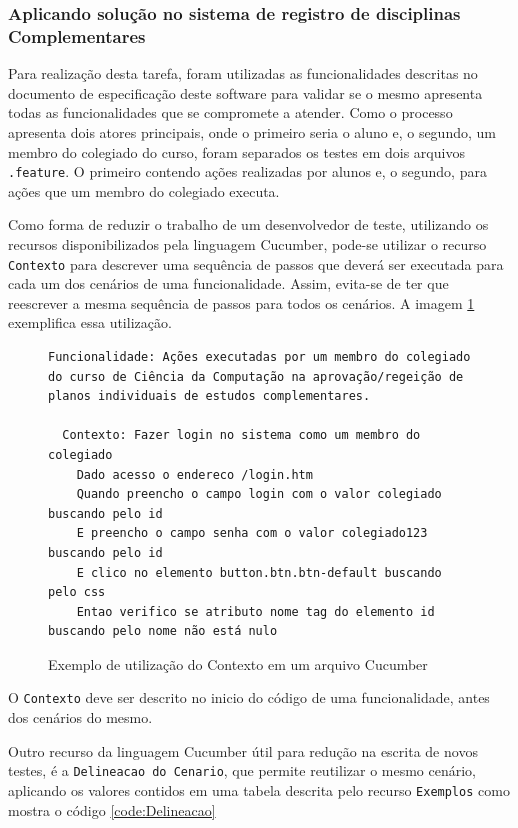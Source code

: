 \documentclass[tg]{mdtufsm}
\begin{document}
\subsubsection{Aplicando solução no sistema de registro de disciplinas Complementares}
Para realização desta tarefa, foram utilizadas as funcionalidades descritas no documento de especificação deste software para validar se o mesmo apresenta todas as funcionalidades que se compromete a atender.
Como o processo apresenta dois atores principais, onde o primeiro seria o aluno e, o segundo, um membro do colegiado do curso, foram separados os testes em dois arquivos \texttt{.feature}. O primeiro contendo ações realizadas por alunos e, o segundo, para ações que um membro do colegiado executa.

Como forma de reduzir o trabalho de um desenvolvedor de teste, utilizando os recursos disponibilizados pela linguagem Cucumber, pode-se utilizar o recurso \texttt{Contexto} para descrever uma sequência de passos que deverá ser executada para cada um dos cenários de uma funcionalidade. Assim, evita-se de ter que reescrever a mesma sequência de passos para todos os cenários. A imagem \ref{code:Contexto} exemplifica essa utilização.

\begin{figure}[!htt]
	\begin{lstlisting}
Funcionalidade: Ações executadas por um membro do colegiado do curso de Ciência da Computação na aprovação/regeição de planos individuais de estudos complementares.

  Contexto: Fazer login no sistema como um membro do colegiado
    Dado acesso o endereco /login.htm
    Quando preencho o campo login com o valor colegiado buscando pelo id
    E preencho o campo senha com o valor colegiado123 buscando pelo id
    E clico no elemento button.btn.btn-default buscando pelo css
    Entao verifico se atributo nome tag do elemento id buscando pelo nome não está nulo
	\end{lstlisting}
	\caption{Exemplo de utilização do Contexto em um arquivo Cucumber}
	\label{code:Contexto}
\end{figure}

O \texttt{Contexto} deve ser descrito no inicio do código de uma funcionalidade, antes dos cenários do mesmo.

Outro recurso da linguagem Cucumber útil para redução na escrita de novos testes, é a \texttt{Delineacao do Cenario}, que permite reutilizar o mesmo cenário, aplicando os
valores contidos em uma tabela descrita pelo recurso \texttt{Exemplos} como mostra o código \ref{code:Delineacao}
\end{document}
